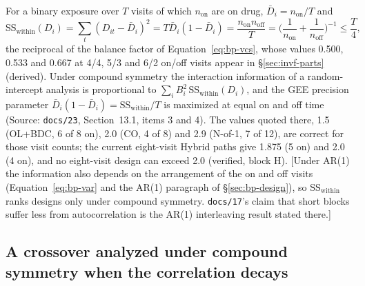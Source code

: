 \documentclass[11pt]{article}
\newcommand{\note}[1]{\textcolor{blue!60!black}{\small [#1]}}
\newcommand{\code}[1]{\texttt{#1}}
\begin{document}
For a binary exposure over $T$ visits of which $n_{\mathrm{on}}$ are on
drug, $\bar D_i = n_{\mathrm{on}}/T$ and
\begin{equation}
\mathrm{SS}_{\mathrm{within}}(D_i) = \sum_t (D_{it} - \bar D_i)^2
  = T\bar D_i(1 - \bar D_i)
  = \frac{n_{\mathrm{on}}n_{\mathrm{off}}}{T}
  = \Big(\frac{1}{n_{\mathrm{on}}} + \frac{1}{n_{\mathrm{off}}}\Big)^{-1}
  \le \frac{T}{4},
\label{eq:inva-ssw}
\end{equation}
the reciprocal of the balance factor of Equation~\eqref{eq:bp-vcs},
whose values 0.500, 0.533 and 0.667 at 4/4, 5/3 and 6/2 on/off visits
appear in \S\ref{sec:invf-parts} (derived). Under compound symmetry the interaction information of a
random-intercept analysis is proportional to
$\sum_i B_i^2\,\mathrm{SS}_{\mathrm{within}}(D_i)$, and the GEE
precision parameter $\bar D_i(1 - \bar D_i) =
\mathrm{SS}_{\mathrm{within}}/T$ is maximized at equal on and off time
(Source: \code{docs/23}, Section~13.1, items 3 and 4). The values quoted
there, 1.5 (OL+BDC, 6 of 8 on), 2.0 (CO, 4 of 8) and 2.9 (N-of-1, 7 of
12), are correct for those visit counts; the current eight-visit Hybrid
paths give 1.875 (5 on) and 2.0 (4 on), and no eight-visit design can
exceed 2.0 (verified, block H). \note{Under AR(1) the information also
depends on the arrangement of the on and off visits
(Equation~\eqref{eq:bp-var} and the AR(1) paragraph of
\S\ref{sec:bp-design}), so $\mathrm{SS}_{\mathrm{within}}$ ranks designs
only under compound symmetry. \code{docs/17}'s claim that short blocks
suffer less from autocorrelation is the AR(1) interleaving result
stated there.}

\subsection{A crossover analyzed under compound symmetry when the
correlation decays}
\label{sec:invf-kappa}
\end{document}
